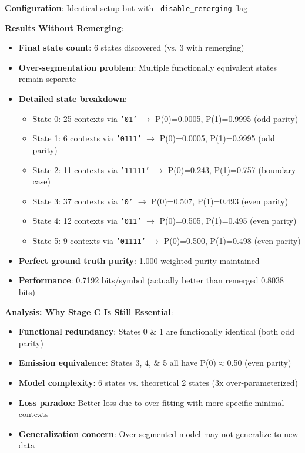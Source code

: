 \documentclass[11pt]{article}
\begin{document}
\begin{resultbox}
\textbf{Configuration}: Identical setup but with \texttt{--disable\_remerging} flag

\textbf{Results Without Remerging}:
\begin{itemize}
\item \textbf{Final state count}: 6 states discovered (vs. 3 with remerging)
\item \textbf{Over-segmentation problem}: Multiple functionally equivalent states remain separate
\item \textbf{Detailed state breakdown}:
  \begin{itemize}
  \item State 0: 25 contexts via \texttt{'01'} $\rightarrow$ P(0)=0.0005, P(1)=0.9995 (odd parity)
  \item State 1: 6 contexts via \texttt{'0111'} $\rightarrow$ P(0)=0.0005, P(1)=0.9995 (odd parity)
  \item State 2: 11 contexts via \texttt{'11111'} $\rightarrow$ P(0)=0.243, P(1)=0.757 (boundary case)
  \item State 3: 37 contexts via \texttt{'0'} $\rightarrow$ P(0)=0.507, P(1)=0.493 (even parity)
  \item State 4: 12 contexts via \texttt{'011'} $\rightarrow$ P(0)=0.505, P(1)=0.495 (even parity)
  \item State 5: 9 contexts via \texttt{'01111'} $\rightarrow$ P(0)=0.500, P(1)=0.498 (even parity)
  \end{itemize}
\item \textbf{Perfect ground truth purity}: 1.000 weighted purity maintained
\item \textbf{Performance}: 0.7192 bits/symbol (actually better than remerged 0.8038 bits)
\end{itemize}

\textbf{Analysis: Why Stage C Is Still Essential}:
\begin{itemize}
\item \textbf{Functional redundancy}: States 0 \& 1 are functionally identical (both odd parity)
\item \textbf{Emission equivalence}: States 3, 4, \& 5 all have P(0)$\approx$0.50 (even parity)
\item \textbf{Model complexity}: 6 states vs. theoretical 2 states (3x over-parameterized)
\item \textbf{Loss paradox}: Better loss due to over-fitting with more specific minimal contexts
\item \textbf{Generalization concern}: Over-segmented model may not generalize to new data
\end{itemize}
\end{resultbox}
\end{document}
